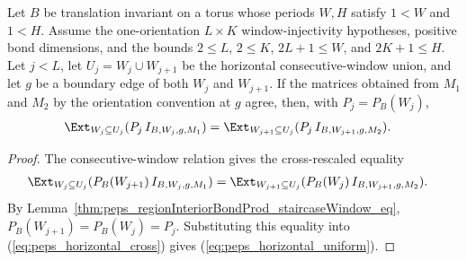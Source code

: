 \begin{lemma}%
    \label{thm:peps_horizontal_staircase_consecutive_window_bond_transport_uniform}
    \leanok
    Let $B$ be translation invariant on a torus whose periods $W,H$ satisfy
    $1<W$ and $1<H$. Assume the one-orientation $L\times K$
    window-injectivity hypotheses,
    positive bond dimensions, and the bounds
    $2\le L$, $2\le K$, $2L+1\le W$, and $2K+1\le H$.
    Let $j<L$, let $U_j=W_j\cup W_{j+1}$ be the horizontal consecutive-window
    union, and let $g$ be a boundary edge of both $W_j$ and $W_{j+1}$. If the
    matrices obtained from $M_1$ and $M_2$ by the orientation convention at
    $g$ agree, then, with $P_j=P_B(W_j)$,
    \begin{align}
        \Ext_{W_j\subseteq U_j}
        (P_j\,I_{B,W_j,g,M_1})
         & =
        \Ext_{W_{j+1}\subseteq U_j}
        (P_j\,I_{B,W_{j+1},g,M_2}).
        \label{eq:peps_horizontal_uniform}
    \end{align}
\end{lemma}
\begin{proof}
    \leanok
    The consecutive-window relation gives the cross-rescaled equality
    \begin{align}
        \Ext_{W_j\subseteq U_j}
        (P_B(W_{j+1})\,I_{B,W_j,g,M_1})
         & =
        \Ext_{W_{j+1}\subseteq U_j}
        (P_B(W_j)\,I_{B,W_{j+1},g,M_2}).
        \label{eq:peps_horizontal_cross}
    \end{align}
    By Lemma~\ref{thm:peps_regionInteriorBondProd_staircaseWindow_eq},
    $P_B(W_{j+1})=P_B(W_j)=P_j$.
    Substituting this equality into (\ref{eq:peps_horizontal_cross})
    gives (\ref{eq:peps_horizontal_uniform}).
\end{proof}

